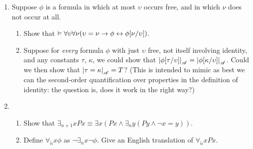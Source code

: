 {\begin{enumerate}
\begin{enumerate}
\end{enumerate}
\item Suppose $\phi$ is a formula in which at most $\upsilon$ occurs free, and in which $\nu$ does not occur at all.  \begin{enumerate}
	\item Show that $\vDash \forall \upsilon \forall \nu (\upsilon=\nu \to \phi \leftrightarrow \phi[\nu/\upsilon])$. 
	\item Suppose for \emph{every} formula $\phi$ with just $\upsilon$ free, not itself involving identity, and any constants $\tau$, $\kappa$, we could show that $\left|\phi[\tau/\upsilon]\right|_{\mathscr{A}} = \left|\phi[\kappa/\upsilon]\right|_{\mathscr{A}}$. Could we then show that $\left|\tau=\kappa\right|_{\mathscr{A}}=T$? (This is intended to mimic as best we can the second-order quantification over properties in the definition of identity: the question is, does it work in the right way?) 
\end{enumerate}
\item \begin{enumerate}
\item  Show that  $\exists_{n+1}x Px \equiv \exists x (Px \wedge \exists_{n} y (Py \wedge \neg x=y))$.
	\item Define $\forall_{\tilde{n}}x\phi$ as $\neg\exists_{n}x\neg\phi$. Give an English translation of $\forall_{\tilde{n}}xPx$.
\end{enumerate} 


\end{enumerate}}
